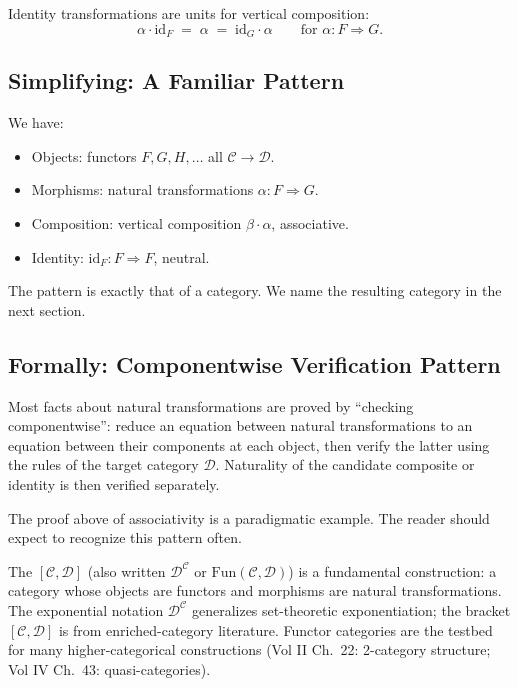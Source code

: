 Identity transformations are units for vertical composition:
\begin{equation*}
  \alpha \cdot \mathrm{id}_F \;=\; \alpha
  \;=\; \mathrm{id}_G \cdot \alpha
  \qquad \text{for } \alpha : F \Rightarrow G.
\end{equation*}

\subsection{Simplifying: A Familiar Pattern}

We have:
\begin{itemize}
  \item Objects: functors $F, G, H, \ldots$ all $\mathcal{C} \to \mathcal{D}$.
  \item Morphisms: natural transformations $\alpha : F \Rightarrow G$.
  \item Composition: vertical composition $\beta \cdot \alpha$, associative.
  \item Identity: $\mathrm{id}_F : F \Rightarrow F$, neutral.
\end{itemize}

The pattern is exactly that of a category. We name the resulting category in
the next section.

\subsection{Formally: Componentwise Verification Pattern}

Most facts about natural transformations are proved by ``checking
componentwise'': reduce an equation between natural transformations to an
equation between their components at each object, then verify the latter
using the rules of the target category $\mathcal{D}$. Naturality of the
candidate composite or identity is then verified separately.

The proof above of associativity is a paradigmatic example. The reader
should expect to recognize this pattern often.


\begin{nameorigin}
The  $[\mathcal{C}, \mathcal{D}]$ (also written
$\mathcal{D}^\mathcal{C}$ or $\mathrm{Fun}(\mathcal{C}, \mathcal{D})$)
is a fundamental construction: a category whose objects are functors
and morphisms are natural transformations. The exponential notation
$\mathcal{D}^\mathcal{C}$ generalizes set-theoretic exponentiation;
the bracket $[\mathcal{C}, \mathcal{D}]$ is from enriched-category
literature. Functor categories are the testbed for many higher-categorical
constructions (Vol II Ch.~22: 2-category structure; Vol IV Ch.~43:
quasi-categories).
\end{nameorigin}

